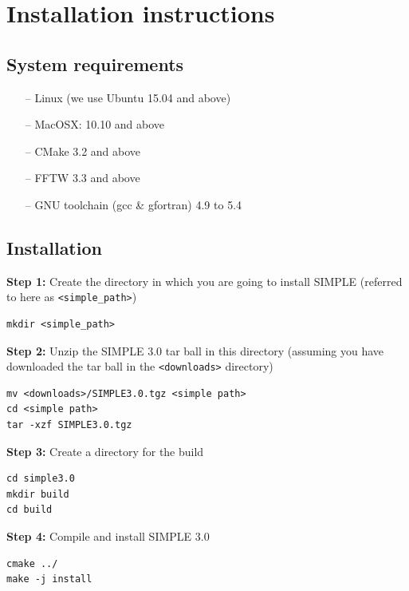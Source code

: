 \documentclass[a4paper,11pt]{article}
\begin{document}
\section{Installation instructions}

\subsection{System requirements}
\begin{itemize}
	\item[--] Linux (we use Ubuntu 15.04 and above)
	\item[--] MacOSX: 10.10 and above
	\item[--] CMake 3.2 and above
	\item[--] FFTW 3.3 and above
	\item[--] GNU toolchain (gcc \& gfortran) 4.9 to 5.4
\end{itemize}

\subsection{Installation}
\noindent{}\textbf{Step 1:} Create the directory in which you are going to install SIMPLE (referred to here as \texttt{<simple\_path>})

\begin{Verbatim}[commandchars=+\[\],fontsize=\small,breaklines=true]
mkdir <simple_path>
\end{Verbatim}

\noindent{}\textbf{Step 2:} Unzip the SIMPLE 3.0 tar ball in this directory (assuming you have downloaded the tar ball in the \texttt{<downloads>} directory)

\begin{Verbatim}[commandchars=+\[\],fontsize=\small,breaklines=true]
mv <downloads>/SIMPLE3.0.tgz <simple path>
cd <simple path>
tar -xzf SIMPLE3.0.tgz
\end{Verbatim}

\noindent{}\textbf{Step 3:} Create a directory for the build

\begin{Verbatim}[commandchars=+\[\],fontsize=\small,breaklines=true]
cd simple3.0
mkdir build
cd build
\end{Verbatim}

\noindent{}\textbf{Step 4:} Compile and install SIMPLE 3.0

\begin{Verbatim}[commandchars=+\[\],fontsize=\small,breaklines=true]
cmake ../
make -j install
\end{Verbatim}
\end{document}
